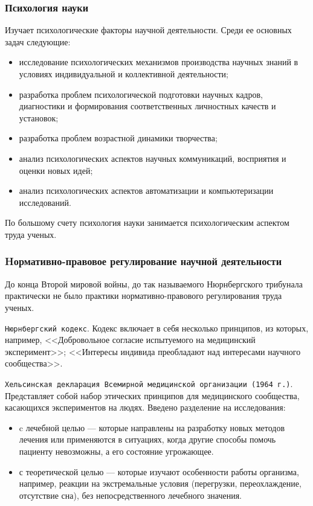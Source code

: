 \subsubsection{Психология науки}
Изучает психологические факторы научной деятельности. Среди ее основных задач следующие: 
\begin{itemize}
    \item исследование психологических механизмов производства научных знаний в условиях индивидуальной и коллективной деятельности;
    \item разработка проблем психологической подготовки научных кадров, диагностики и формирования соответственных личностных качеств и установок;
    \item разработка проблем возрастной динамики творчества;
    \item анализ психологических аспектов научных коммуникаций, восприятия и оценки новых идей;
    \item анализ психологических аспектов автоматизации и компьютеризации исследований.
\end{itemize}
По большому счету психология науки занимается психологическим аспектом труда ученых. 

\subsubsection{Hормативно-правовое регулирование научной деятельности}

До конца Второй мировой войны, до так называемого Нюрнбергского трибунала практически не было практики нормативно-правового регулирования труда ученых. 

\texttt{Нюрнбергский кодекс}. Кодекс включает в себя несколько принципов, из которых, например, <<Добровольное согласие испытуемого на медицинский эксперимент>>; <<Интересы индивида преобладают над интересами научного сообщества>>.

\texttt{Хельсинская декларация Всемирной медицинской организации (1964 г.)}. 
Представляет собой набор этических принципов для медицинского сообщества, касающихся экспериментов на людях. Введено разделение на исследования:
\begin{itemize}
    \item c лечебной целью — которые направлены на разработку новых методов лечения или применяются в ситуациях, когда другие способы помочь пациенту невозможны, а его состояние угрожающее.
    \item с теоретической целью — которые изучают особенности работы организма, например, реакции на экстремальные условия (перегрузки, переохлаждение, отсутствие сна), без непосредственного лечебного значения.
\end{itemize}

